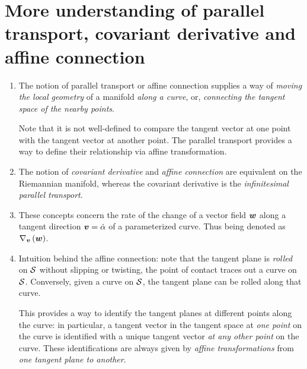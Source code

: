 \documentclass[11pt]{article}
\begin{document}
\section{More understanding of parallel transport, covariant derivative and affine connection}
\begin{enumerate}
\item The notion of parallel transport or affine connection supplies a way of \emph{moving the local geometry} of a manifold \emph{along a curve}, or, \emph{connecting the tangent space of the nearby points}.

 Note that it is not well-defined to compare the tangent vector at one point with the tangent vector at another point. The parallel transport provides a way to define their relationship via affine transformation.

\item The notion of \emph{covariant derivative} and \emph{affine connection} are equivalent on the Riemannian manifold, whereas the covariant derivative is the \emph{infinitesimal parallel transport}. 

\item These concepts concern the rate of the change of a vector field $\boldsymbol{w}$ along a tangent direction $\boldsymbol{v} = \dot{\alpha}$ of a parameterized curve. Thus being denoted as $\nabla_{\boldsymbol{v}}\left(\boldsymbol{w}\right)$. \\[5pt]

\item Intuition behind the affine connection:  note that the tangent plane is \emph{rolled} on ${\mathcal S}$ without slipping or twisting, the point of contact traces out a curve on ${\mathcal S}$. Conversely, given a curve on ${\mathcal S}$, the tangent plane can be rolled along that curve. 

This provides a way to identify the tangent planes at different points along the curve: in particular, a tangent vector in the tangent space at \emph{one point} on the curve is identified with a unique tangent vector \emph{at any other point} on the curve. These identifications are always given by \emph{affine transformations} from \emph{one tangent plane to another}.


\end{enumerate}
\end{document}

